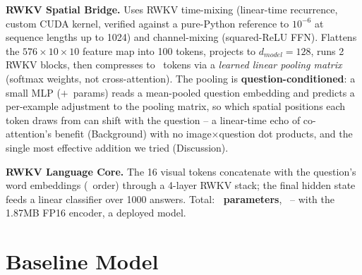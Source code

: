 \documentclass[final]{article}
\begin{document}
\textbf{RWKV Spatial Bridge.} Uses RWKV time-mixing (linear-time recurrence, custom CUDA kernel,
verified against a pure-Python reference to $10^{-6}$ at sequence lengths up to 1024) and
channel-mixing (squared-ReLU FFN). Flattens the $576\times10\times10$ feature map into 100 tokens,
projects to $d_{model}=128$, runs 2 RWKV blocks, then compresses to \primaryTunedK\ tokens via a
\emph{learned linear pooling matrix} (softmax weights, not cross-attention). The pooling is
\textbf{question-conditioned}: a small MLP ($+$\qCondExtraParams\ params) reads a mean-pooled
question embedding and predicts a per-example adjustment to the pooling matrix, so which spatial
positions each token draws from can shift with the question -- a linear-time echo of co-attention's
benefit (Background) with no image$\times$question dot products, and the single most effective
addition we tried (Discussion).

\textbf{RWKV Language Core.} The 16 visual tokens concatenate with the question's word embeddings
(\primaryTunedTokenOrder\ order) through a 4-layer RWKV stack; the final hidden state feeds a
linear classifier over 1000 answers. Total: \textbf{\primaryParams\ parameters}, \primarySize\ --
with the 1.87MB FP16 encoder, a \textbf{\primaryTotalSize} deployed model.

\section*{Baseline Model}
\end{document}
